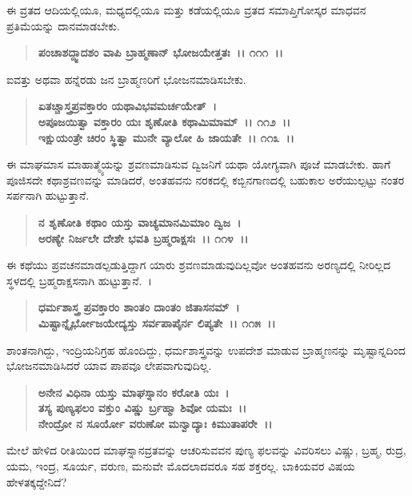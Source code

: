 ಈ ವ್ರತದ ಆದಿಯಲ್ಲಿಯೂ, ಮಧ್ಯದಲ್ಲಿಯೂ ಮತ್ತು ಕಡೆಯಲ್ಲಿಯೂ ವ್ರತದ ಸಮಾಪ್ತಿಗೋಸ್ಕರ ಮಾಧವನ ಪ್ರತಿಮೆಯನ್ನು ದಾನಮಾಡಬೇಕು.

\begin{verse}
\textbf{ಪಂಚಾಶದ್ದ್ವಾದಶಂ ವಾಪಿ ಬ್ರಾಹ್ಮಣಾನ್ ಭೋಜಯೇತ್ತತಃ~।। ೧೧೧~।।}
\end{verse}

ಐವತ್ತು ಅಥವಾ ಹನ್ನೆರಡು ಜನ ಬ್ರಾಹ್ಮಣರಿಗೆ ಭೋಜನಮಾಡಿಸಬೇಕು.

\begin{verse}
\textbf{ಏತಚ್ಚಾಸ್ತ್ರಪ್ರವಕ್ತಾರಂ ಯಥಾವಿಭವಮರ್ಚಯೇತ್~।}\\\textbf{ಅಪೂಜಯಿತ್ವಾ ವಕ್ತಾರಂ ಯಃ ಶೃಣೋತಿ ಕಥಾಮಿಮಾಮ್~।। ೧೧೨~।। }\\\textbf{ಇಕ್ಷುಯಂತ್ರೇ ಚಿರಂ ಸ್ಥಿತ್ವಾ ಮುನೇ ವ್ಯಾಲೋ ಹಿ ಜಾಯತೇ~।। ೧೧೩~।।}
\end{verse}

ಈ ಮಾಘಮಾಸ ಮಾಹಾತ್ಮ್ಯೆಯನ್ನು ಶ್ರವಣಮಾಡಿಸುವ ದ್ವಿಜನಿಗೆ ಯಥಾ ಯೋಗ್ಯವಾಗಿ ಪೂಜೆ ಮಾಡಬೇಕು. ಹಾಗೆ ಪೂಜಿಸದೇ ಕಥಾಶ್ರವಣವನ್ನು ಮಾಡಿದರೆ, ಅಂತಹವನು ನರಕದಲ್ಲಿ ಕಬ್ಬಿನಗಾಣದಲ್ಲಿ ಬಹುಕಾಲ ಅರೆಯುಲ್ಪಟ್ಟು ನಂತರ ಸರ್ಪನಾಗಿ ಹುಟ್ಟುತ್ತಾನೆ.

\begin{verse}
\textbf{ನ ಶೃಣೋತಿ ಕಥಾಂ ಯಸ್ತು ವಾಚ್ಯಮಾನಮಿಮಾಂ ದ್ವಿಜ~।}\\\textbf{ಅರಣ್ಯೇ ನಿರ್ಜಲೇ ದೇಶೇ ಭವತಿ ಬ್ರಹ್ಮರಾಕ್ಷಸಃ~।। ೧೧೪~।।}
\end{verse}

ಈ ಕಥೆಯು ಪ್ರವಚನಮಾಡಲ್ಪಡುತ್ತಿದ್ದಾಗ ಯಾರು ಶ್ರವಣಮಾಡುವುದಿಲ್ಲವೋ ಅಂತಹವನು ಅರಣ್ಯದಲ್ಲಿ ನೀರಿಲ್ಲದ ಸ್ಥಳದಲ್ಲಿ ಬ್ರಹ್ಮರಾಕ್ಷಸನಾಗಿ ಹುಟ್ಟುತ್ತಾನೆ.~।

\begin{verse}
\textbf{ಧರ್ಮಶಾಸ್ತ್ರ ಪ್ರವಕ್ತಾರಂ ಶಾಂತಂ ದಾಂತಂ ಜಿತಾಸನಮ್~।}\\\textbf{ಮಿಷ್ಟಾನ್ನೈರ್ಭೋಜಯೇದ್ಯಸ್ತು ಸರ್ವಪಾಪೈರ್ನ ಲಿಪ್ಯತೇ~।। ೧೧೫~।।}
\end{verse}

ಶಾಂತನಾಗಿದ್ದು, ಇಂದ್ರಿಯನಿಗ್ರಹ ಹೊಂದಿದ್ದು, ಧರ್ಮಶಾಸ್ತ್ರವನ್ನು ಉಪದೇಶ ಮಾಡುವ ಬ್ರಾಹ್ಮಣನನ್ನು ಮೃಷ್ಟಾನ್ನದಿಂದ ಭೋಜನಮಾಡಿಸಿದರೆ ಯಾವ ಪಾಪವೂ ಲೇಪವಾಗುವುದಿಲ್ಲ.

\begin{verse}
\textbf{ಅನೇನ ವಿಧಿನಾ ಯಸ್ತು ಮಾಘಸ್ನಾನಂ ಕರೋತಿ ಯಃ~।}\\\textbf{ತಸ್ಯ ಪುಣ್ಯಫಲಂ ವಕ್ತುಂ ವಿಷ್ಣು ರ್ಬ್ರಹ್ಮಾ ಶಿವೋ ಯಮಃ~।। }\\\textbf{ನೇಂದ್ರೋ ನ ಸೂರ್ಯೋ ವರುಣೋ ಮನ್ವಾದ್ಯಾಃ ಕಿಮುತಾಪರೇ~।।}
\end{verse}

ಮೇಲೆ ಹೇಳಿದ ರೀತಿಯಿಂದ ಮಾಘಸ್ನಾನವ್ರತವನ್ನು ಆಚರಿಸುವವನ ಪುಣ್ಯ ಫಲವನ್ನು ವಿವರಿಸಲು ವಿಷ್ಣು, ಬ್ರಹ್ಮ, ರುದ್ರ, ಯಮ, ಇಂದ್ರ, ಸೂರ್ಯ, ವರುಣ, ಮನುವೇ ಮೊದಲಾದವರೂ ಸಹ ಶಕ್ತರಲ್ಲ. ಬಾಕಿಯವರ ವಿಷಯ ಹೇಳತಕ್ಕದ್ದೇನಿದೆ?

